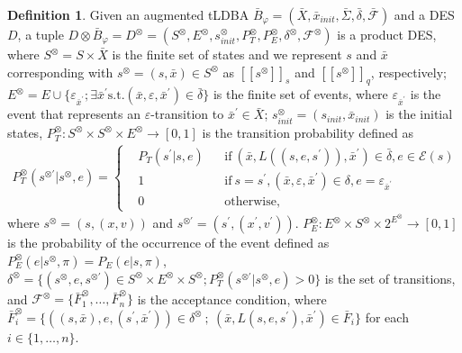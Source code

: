 \documentclass[10 pt, dvipdfmx]{article}
\theoremstyle{definition}
\newtheorem{definition}{Definition}[section]
\newcommand{\mysps}{\ensuremath{[\![s^{\otimes}]\!]}_s}
\newcommand{\myspq}{\ensuremath{[\![s^{\otimes}]\!]}_q}
\begin{document}
\begin{definition}
  Given an augmented tLDBA $\bar{B}_{\varphi} = (\bar{X}, \bar{x}_{init},\bar{\Sigma},\bar{\delta},\bar{\mathcal{F}})$ and a DES $D$, a tuple $D \otimes \bar{B}_{\varphi} = D^{\otimes} = (S^{\otimes}, E^{\otimes}, s_{init}^{\otimes}, P^{\otimes}_T, P^{\otimes}_E, \delta^{\otimes}, {\mathcal F}^{\otimes})$ is a product DES, where
  $S^{\otimes} = S \times \bar{X}$ is the finite set of states and we represent $s$ and $\bar{x}$ corresponding with $s^{\otimes} = (s,\bar{x}) \in S^{\otimes}$ as $\mysps$ and $\myspq$, respectively; $E^{\otimes}=E \cup \{ \varepsilon_{\bar{x}^{\prime}} ; \exists \bar{x}^{\prime} \text{s.t.} (\bar{x}, \varepsilon, \bar{x}^{\prime}) \in \bar{\delta} \} $ is the finite set of events, where $\varepsilon_{\bar{x}^{\prime}}$ is the event that represents an $\varepsilon$-transition to $\bar{x}^{\prime} \in \bar{X}$; $s_{init}^{\otimes} = (s_{init},\bar{x}_{init})$ is the initial states, $P^{\otimes}_T : S^{\otimes} \times S^{\otimes} \times E^{\otimes} \rightarrow [0,1]$ is the transition probability defined as
  \begin{align}
    P^{\otimes}_T(s^{\otimes \prime} | s^{\otimes}, e) =
    \left\{
    \begin{aligned}
      &P_T(s^{\prime} | s, e) &   &\text{if}\  (\bar{x}, L((s,e,s^{\prime})), \bar{x}^{\prime}) \in \bar{\delta}, e \in \mathcal{E}(s) \\
      &1 &   &\text{if}\ s=s^{\prime}, (\bar{x}, \varepsilon, \bar{x}^{\prime}) \in \delta, e= \varepsilon_{\bar{x}^{\prime}} \\
      &0 &   &\text{otherwise} ,
    \end{aligned}
    \right. \nonumber
  \end{align}
  where $s^{\otimes} = (s,(x,v))$ and $s^{\otimes \prime} = (s^{\prime}, (x^{\prime}, v^{\prime}))$.
  $P^{\otimes}_E : E^{\otimes} \times S^{\otimes} \times 2^{E^{\otimes}} \rightarrow [0,1]$ is the probability of the occurrence of the event defined as $P^{\otimes}_E(e | s^{\otimes}, \pi) = P_E(e | s, \pi)$, $\delta^{\otimes} = \{ (s^{\otimes}, e, s^{\otimes \prime}) \in S^{\otimes} \times E^{\otimes} \times S^{\otimes} ; P^{\otimes}_T(s^{\otimes \prime} | s^{\otimes}, e) > 0 \}$ is the set of transitions, and ${\mathcal F}^{\otimes} = \{ \bar{F}^{\otimes}_1, \ldots ,\bar{F}^{\otimes}_n \}$ is the acceptance condition, where $\bar{F}^{\otimes}_i = \{ ((s,\bar{x}), e, (s^{\prime}, \bar{x}^{\prime})) \in \delta^{\otimes}\ ;\ (\bar{x}, L(s,e,s^{\prime}), \bar{x}^{\prime}) \in \bar{F}_i \}$ for each $ i \in \{ 1, \ldots ,n \}$.
\end{definition}
\end{document}

